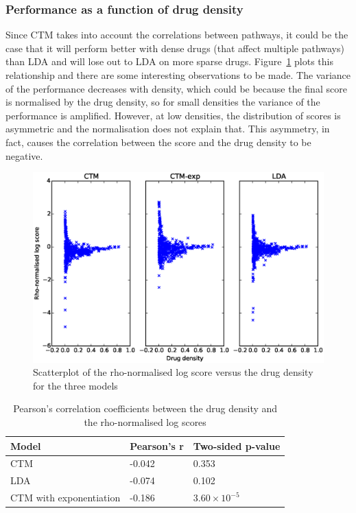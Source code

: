 \documentclass[12pt,a4paper,twoside,openright]{report}
\begin{document}
\subsubsection{Performance as a function of drug density}

Since CTM takes into account the correlations between pathways, it could be the case that it will perform better with dense drugs (that affect multiple pathways) than LDA and will lose out to LDA on more sparse drugs. Figure~\ref{fig:ctd-ctm-lda-scatter} plots this relationship and there are some interesting observations to be made. The variance of the performance decreases with density, which could be because the final score is normalised by the drug density, so for small densities the variance of the performance is amplified. However, at low densities, the distribution of scores is asymmetric and the normalisation does not explain that. This asymmetry, in fact, causes the correlation between the score and the drug density to be negative.

\begin{figure}[!htb]
\includegraphics[width=\textwidth]{ctd-ctm-lda-scatter.eps}
\caption{Scatterplot of the rho-normalised log score versus the drug density for the three models}
\label{fig:ctd-ctm-lda-scatter}
\end{figure}

\begin{table}
\begin{tabu}{| l | l | l |}
\hline
Model & Pearson's r & Two-sided p-value \\
\hline
CTM & -0.042 & 0.353 \\
LDA & -0.074 & 0.102 \\
CTM with exponentiation & -0.186 & $3.60 \times 10^{-5}$ \\
\hline
\end{tabu}
\caption{Pearson's correlation coefficients between the drug density and the rho-normalised log scores}
\label{tab:ctm-density-correlation}
\end{table}
\end{document}
